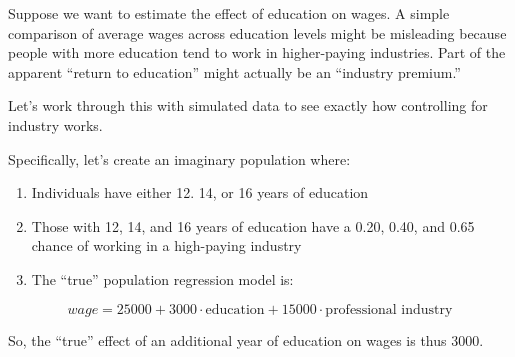 \documentclass[
  letterpaper,
  DIV=11,
  numbers=noendperiod]{scrreprt}
\providecommand{\tightlist}{%
  \setlength{\itemsep}{0pt}\setlength{\parskip}{0pt}}
\begin{document}
Suppose we want to estimate the effect of education on wages. A simple
comparison of average wages across education levels might be misleading
because people with more education tend to work in higher-paying
industries. Part of the apparent ``return to education'' might actually
be an ``industry premium.''

Let's work through this with simulated data to see exactly how
controlling for industry works.

Specifically, let's create an imaginary population where:

\begin{enumerate}
\def\labelenumi{\arabic{enumi}.}
\tightlist
\item
  Individuals have either 12. 14, or 16 years of education
\item
  Those with 12, 14, and 16 years of education have a 0.20, 0.40, and
  0.65 chance of working in a high-paying industry
\item
  The ``true'' population regression model is:
\end{enumerate}

\[
wage = 25000 + 3000 \cdot \text{education} + 15000 \cdot \text{professional industry} 
\]

So, the ``true'' effect of an additional year of education on wages is
thus 3000.
\end{document}
